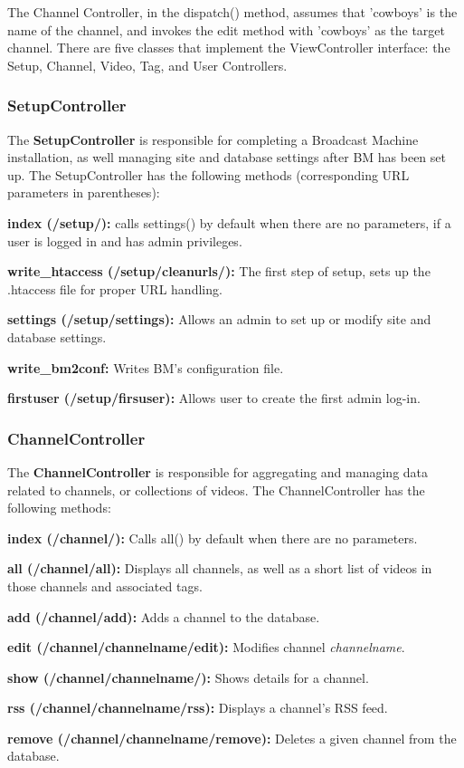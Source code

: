 \documentclass[a4paper,12pt]{report}
\begin{document}
The Channel Controller, in the dispatch() method, assumes that 'cowboys' is the name of the channel, and invokes the edit method with 'cowboys' as the target channel. There are five classes that implement the ViewController interface: the Setup, Channel, Video, Tag, and User Controllers. \\

\subsubsection{SetupController}
The \textbf{SetupController} is responsible for completing a Broadcast Machine installation, as well managing site  and database settings after BM has been set up. The SetupController has the following methods (corresponding URL parameters in parentheses):
\begin{description}
\item{\textbf{index (/setup/): }calls settings() by default when there are no parameters, if a user is logged in and has admin privileges.}
\item{\textbf{write\_htaccess (/setup/cleanurls/): }The first step of setup, sets up the .htaccess file for proper URL handling.}
\item{\textbf{settings (/setup/settings): } Allows an admin to set up or modify site and database settings.}
\item{\textbf{write\_bm2conf: } Writes BM's configuration file.}
\item{\textbf{firstuser (/setup/firsuser): } Allows user to create the first admin log-in.} \\
\end{description} 

\subsubsection{ChannelController}
The \textbf{ChannelController} is responsible for aggregating and managing data related to channels, or collections of videos. The ChannelController has the following methods:
\begin{description}
\item{\textbf{index (/channel/): } Calls all() by default when there are no parameters.}
\item{\textbf{all (/channel/all): } Displays all channels, as well as a short list of videos in those channels and associated tags.}
\item{\textbf{add (/channel/add): } Adds a channel to the database.}
\item{\textbf{edit (/channel/channelname/edit): } Modifies channel \textit{channelname}.}
\item{\textbf{show (/channel/channelname/): } Shows details for a channel.}
\item{\textbf{rss (/channel/channelname/rss): } Displays a channel's RSS feed.}
\item{\textbf{remove (/channel/channelname/remove): } Deletes a given channel from the database.} \\
\end{description} 
\end{document}
